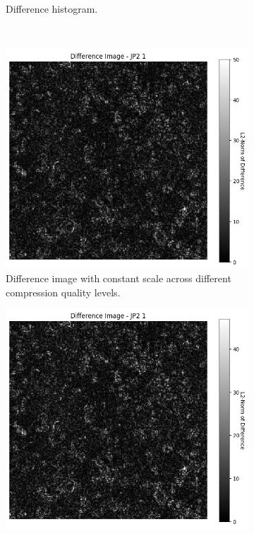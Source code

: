 \begin{figure}[htb]
\begin{subfigure}[b]{0.48\textwidth}
        \caption{Difference histogram.}
        \label{fig:img_quality_comp_jp2_1_center_histo}
    \end{subfigure}
    \\
    \begin{subfigure}[b]{0.48\textwidth}
        \centering
        \includegraphics[width=\textwidth]{doc/thesis/0_figures/compare_quality/set1/jp2_1_center_diff_heatmap.png}
        \caption{Difference image with constant scale across different compression quality levels.}
        \label{fig:img_quality_comp_jp2_1_center_diff}
    \end{subfigure}
    \begin{subfigure}[b]{0.48\textwidth}
        \centering
        \includegraphics[width=\textwidth]{doc/thesis/0_figures/compare_quality/set1/jp2_1_center_diff_heatmap_rel.png}

\end{subfigure}
\end{figure}
